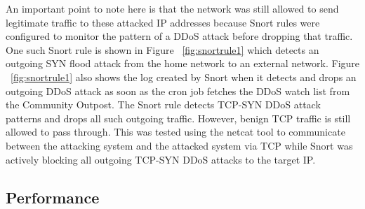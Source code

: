 An important point to note here is that the network was still allowed to send legitimate traffic to these attacked IP addresses because Snort rules were configured to monitor the pattern of a DDoS attack before dropping that traffic. One such Snort rule is shown in Figure ~\ref{fig:snortrule1} which detects an outgoing SYN flood attack from the home network to an external network. Figure ~\ref{fig:snortrule1} also shows the log created by Snort when it detects and drops an outgoing DDoS attack as soon as the cron job fetches the DDoS watch list from the Community Outpost. The Snort rule detects TCP-SYN DDoS attack patterns and drops all such outgoing traffic. However, benign TCP traffic is still allowed to pass through. This was tested using the netcat tool \cite{netcat} to communicate between the attacking system and the attacked system via TCP while Snort was actively blocking all outgoing TCP-SYN DDoS attacks to the target IP.

\subsection{Performance}
\label{sec:eval:performance}
